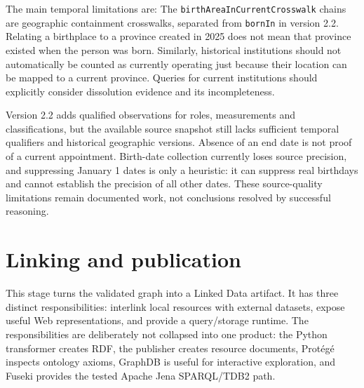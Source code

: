 \documentclass[11pt,a4paper]{article}
\newcommand{\term}[1]{\texttt{#1}}
\begin{document}
The main temporal limitations are:
The \term{birthAreaInCurrentCrosswalk} chains are geographic containment crosswalks, separated from \term{bornIn} in version 2.2. Relating a birthplace to
a province created in 2025 does not mean that province existed when the person was born.
Similarly, historical institutions should not automatically be counted as currently
operating just because their location can be mapped to a current province. Queries for
current institutions should explicitly consider dissolution evidence and its incompleteness.

Version 2.2 adds qualified observations for roles, measurements and classifications, but
the available source snapshot still lacks sufficient temporal qualifiers and historical geographic versions. Absence of an end date is not proof of a current
appointment. Birth-date collection currently loses source precision, and suppressing
January 1 dates is only a heuristic: it can suppress real birthdays and cannot establish
the precision of all other dates. These source-quality limitations remain documented
work, not conclusions resolved by successful reasoning.

\section{Linking and publication}
This stage turns the validated graph into a Linked Data artifact. It has three distinct
responsibilities: interlink local resources with external datasets, expose useful Web
representations, and provide a query/storage runtime. The responsibilities are deliberately
not collapsed into one product: the Python transformer creates RDF, the publisher creates
resource documents, Protégé inspects ontology axioms, GraphDB is useful for interactive
exploration, and Fuseki provides the tested Apache Jena SPARQL/TDB2 path.
\end{document}
